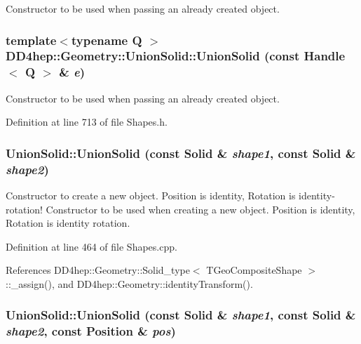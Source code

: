 Constructor to be used when passing an already created object. \hypertarget{class_d_d4hep_1_1_geometry_1_1_union_solid_ae6ccacc6c2f88a5d799775e259b0dac3}{
\subsubsection[{UnionSolid}]{\setlength{\rightskip}{0pt plus 5cm}template$<$typename Q $>$ DD4hep::Geometry::UnionSolid::UnionSolid (const {\bf Handle}$<$ Q $>$ \& {\em e})}}
\label{class_d_d4hep_1_1_geometry_1_1_union_solid_ae6ccacc6c2f88a5d799775e259b0dac3}


Constructor to be used when passing an already created object. 

Definition at line 713 of file Shapes.h.\hypertarget{class_d_d4hep_1_1_geometry_1_1_union_solid_ac7992ce96fd9cb28f65d7c85ee114be7}{
\subsubsection[{UnionSolid}]{\setlength{\rightskip}{0pt plus 5cm}UnionSolid::UnionSolid (const {\bf Solid} \& {\em shape1}, \/  const {\bf Solid} \& {\em shape2})}}
\label{class_d_d4hep_1_1_geometry_1_1_union_solid_ac7992ce96fd9cb28f65d7c85ee114be7}


Constructor to create a new object. Position is identity, Rotation is identity-\/rotation! Constructor to be used when creating a new object. Position is identity, Rotation is identity rotation. 

Definition at line 464 of file Shapes.cpp.

References DD4hep::Geometry::Solid\_\-type$<$ TGeoCompositeShape $>$::\_\-assign(), and DD4hep::Geometry::identityTransform().\hypertarget{class_d_d4hep_1_1_geometry_1_1_union_solid_a0decd4e3d915dc725a2e85163fc0b604}{
\subsubsection[{UnionSolid}]{\setlength{\rightskip}{0pt plus 5cm}UnionSolid::UnionSolid (const {\bf Solid} \& {\em shape1}, \/  const {\bf Solid} \& {\em shape2}, \/  const {\bf Position} \& {\em pos})}}
\label{class_d_d4hep_1_1_geometry_1_1_union_solid_a0decd4e3d915dc725a2e85163fc0b604}


